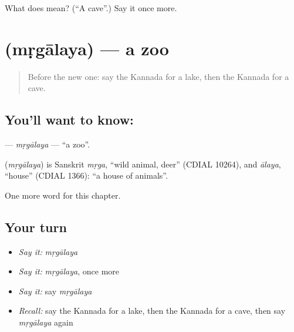 \begin{tcolorbox}[breakable,colback=teal!4,colframe=teal!35!black,title={Before you move on}]
What does  mean? (\textquotedblleft{}A cave\textquotedblright{}.) Say it once more.
\end{tcolorbox}
\section[\texorpdfstring{\kn{ಮೃಗಾಲಯ} (mṛgālaya)}{ಮೃಗಾಲಯ (mṛgālaya)}]{ (mṛgālaya) — a zoo}

\label{lesson:KA-C174-mrgalaya}



\begin{quote}
Before the new one: say the Kannada for a lake, then the Kannada for a cave.
\end{quote}

\subsection*{You'll want to know: }
\textbf{} — \emph{mṛgālaya} — \textquotedblleft{}a zoo\textquotedblright{}.

\begin{cousinweb}
\textbf{} (\emph{mṛgālaya}) is Sanskrit \emph{mṛga}, \textquotedblleft{}wild animal, deer\textquotedblright{} (CDIAL 10264), and \emph{ālaya}, \textquotedblleft{}house\textquotedblright{} (CDIAL 1366): \textquotedblleft{}a house of animals\textquotedblright{}.
\end{cousinweb}

\begin{grammarlens}[title={What you've built}]
One more word for this chapter.
\end{grammarlens}

\subsection*{Your turn}
\begin{itemize}
\raggedright
  \item \emph{Say it:} \emph{mṛgālaya}
  \item \emph{Say it:} \emph{mṛgālaya}, once more
  \item \emph{Say it:} say \emph{mṛgālaya}
  \item \emph{Recall:} say the Kannada for a lake, then the Kannada for a cave, then say \emph{mṛgālaya} again
\end{itemize}

